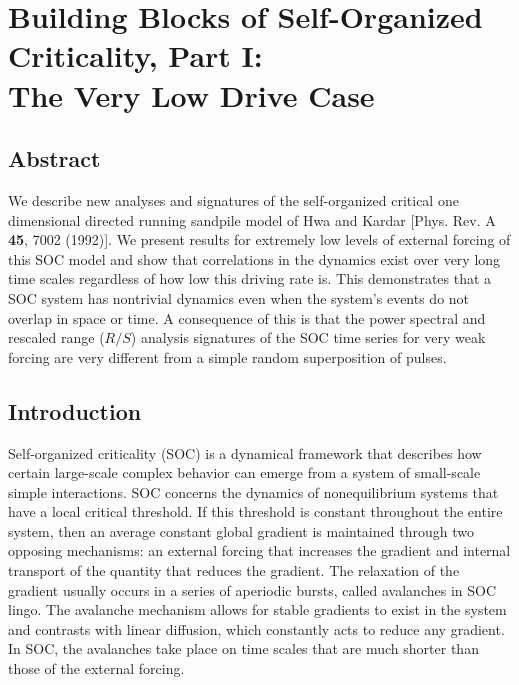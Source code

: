 \chapter{Building Blocks of Self-Organized Criticality, Part I: \\
The Very Low Drive Case}
\label{sec:partI}

\bigskip

\renewcommand{\cite}{\citet}

\section*{Abstract}
\label{sec:partI_abstract}
We describe new analyses and signatures of the self-organized critical
one dimensional directed running sandpile model of Hwa and Kardar
[Phys. Rev. A {\bf 45}, 7002 (1992)].  We present results for
extremely low levels of external forcing of this SOC model and show
that correlations in the dynamics exist over very long time scales
regardless of how low this driving rate is.  This demonstrates that a
SOC system has nontrivial dynamics even when the system's events do
not overlap in space or time.  A consequence of this is that the power
spectral and rescaled range ($R/S$) analysis signatures of the SOC
time series for very weak forcing are very different from a simple
random superposition of pulses.

\section{Introduction}
\label{sec:partI_introduction}

Self-organized criticality (SOC) \cite{btw87a,btw88a} is a dynamical
framework that describes how certain large-scale complex behavior can
emerge from a system of small-scale simple interactions.  SOC concerns
the dynamics of nonequilibrium systems that have a local critical
threshold.  If this threshold is constant throughout the entire
system, then an average constant global gradient is maintained through
two opposing mechanisms: an external forcing that increases the
gradient and internal transport of the quantity that reduces the
gradient.  The relaxation of the gradient usually occurs in a series
of aperiodic bursts, called avalanches in SOC lingo.  The avalanche
mechanism allows for stable gradients to exist in the system and
contrasts with linear diffusion, which constantly acts to reduce any
gradient.  In SOC, the avalanches take place on time scales that are
much shorter than those of the external forcing.

